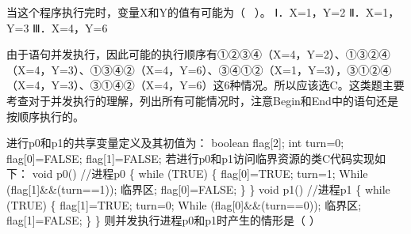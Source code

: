 当这个程序执行完时，变量X和Y的值有可能为（ ~）。 Ⅰ．X=1，Y=2 Ⅱ．X=1，Y=3
Ⅲ．X=4，Y=6
\par{}
\begin{solution}由于语句并发执行，因此可能的执行顺序有①②③④（X=4，Y=2）、①③②④（X=4，Y=3）、①③④②（X=4，Y=6）、③④①②（X=1，Y=3），③①②④（X=4，Y=3）、③①④②（X=4，Y=6）这6种情况。所以应该选C。这类题主要考查对于并发执行的理解，列出所有可能情况时，注意Begin和End中的语句还是按顺序执行的。
\end{solution}
\question 进行p0和p1的共享变量定义及其初值为： boolean flag{[}2{]}; int turn=0;
flag{[}0{]}=FALSE; flag{[}1{]}=FALSE;
若进行p0和p1访问临界资源的类C代码实现如下： void p0() //进程p0 \{ while
(TRUE) \{ flag{[}0{]}=TRUE; turn=1; While (flag{[}1{]}\&\&(turn==1));
临界区; flag{[}0{]}=FALSE; \} \} void p1() //进程p1 \{ while (TRUE) \{
flag{[}1{]}=TRUE; turn=0; While (flag{[}0{]}\&\&(turn==0)); 临界区;
flag{[}1{]}=FALSE; \} \} 则并发执行进程p0和p1时产生的情形是（ ）
\par{}
